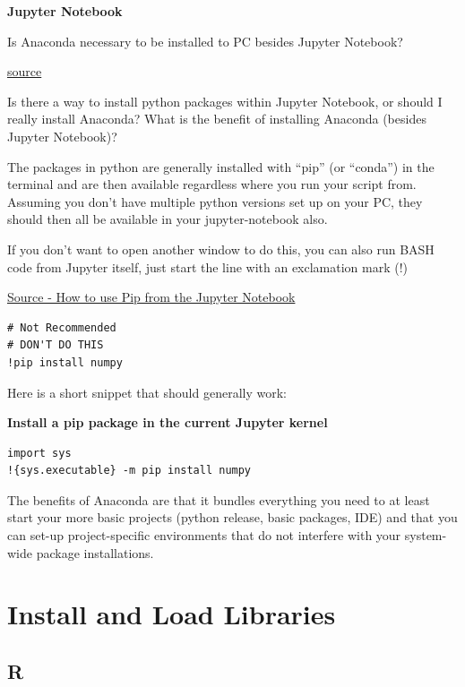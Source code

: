 \documentclass[
]{book}
\begin{document}
\textbf{Jupyter Notebook}

Is Anaconda necessary to be installed to PC besides Jupyter Notebook?

\href{https://stackoverflow.com/questions/64426680/is-anaconda-necessary-to-be-installed-to-pc-besides-jupyter-notebook}{source}

Is there a way to install python packages within Jupyter Notebook, or should I really install Anaconda? What is the benefit of installing Anaconda (besides Jupyter Notebook)?

The packages in python are generally installed with ``pip'' (or ``conda'') in the terminal and are then available regardless where you run your script from. Assuming you don't have multiple python versions set up on your PC, they should then all be available in your jupyter-notebook also.

If you don't want to open another window to do this, you can also run BASH code from Jupyter itself, just start the line with an exclamation mark (!)

\href{https://jakevdp.github.io/blog/2017/12/05/installing-python-packages-from-jupyter/}{Source - How to use Pip from the Jupyter Notebook}

\begin{verbatim}
# Not Recommended 
# DON'T DO THIS
!pip install numpy
\end{verbatim}

Here is a short snippet that should generally work:

\textbf{Install a pip package in the current Jupyter kernel}

\begin{verbatim}
import sys
!{sys.executable} -m pip install numpy
\end{verbatim}

The benefits of Anaconda are that it bundles everything you need to at least start your more basic projects (python release, basic packages, IDE) and that you can set-up project-specific environments that do not interfere with your system-wide package installations.

\hypertarget{install-and-load-libraries}{%
\section{Install and Load Libraries}\label{install-and-load-libraries}}

\hypertarget{r-4}{%
\subsection{R}\label{r-4}}
\end{document}
